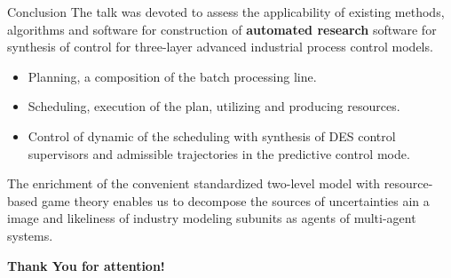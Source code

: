 \documentclass[10pt,dvipsnames]{beamer}
\begin{document}
\begin{frame}{Conclusion}
  The talk was devoted to assess the applicability of existing methods, algorithms and software for construction of \textbf{automated research} software for synthesis of control for three-layer advanced industrial process control models.
  \begin{itemize}
  \item Planning, a composition of the batch processing line.
  \item Scheduling, execution of the plan, utilizing and producing resources.
  \item Control of dynamic of the scheduling with synthesis of DES control supervisors and admissible trajectories in the predictive control mode.
  \end{itemize}

  The enrichment of the convenient standardized two-level model with resource-based game theory enables us to decompose the sources of uncertainties ain a image and likeliness of industry modeling subunits as agents of multi-agent systems.

\end{frame}


\begin{frame}{}
  \vfill
  \centering
  \Huge \textbf{Thank You for attention!}
  \vfill
\end{frame}
\end{document}
